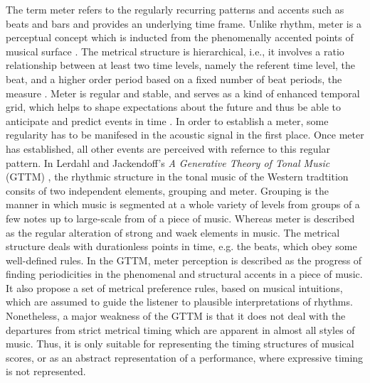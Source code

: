 \documentclass{scrartcl}
\begin{document}
The term meter refers to the regularly recurring patterns and accents such as beats and bars and provides an underlying time frame. Unlike rhythm, meter is a perceptual concept which is inducted from the phenomenally accented points of musical surface \cite{London2004}. The metrical structure is hierarchical, i.e., it involves a ratio relationship between at least two time levels, namely the referent time level, the beat, and a higher order period based on a fixed number of beat periods, the measure \cite{Yeston1976}. Meter is regular and stable, and serves as a kind of enhanced temporal grid, which helps to shape expectations about the future and thus be able to anticipate and predict events in time \cite{Huron2006}. In order to establish a meter, some regularity has to be manifesed in the acoustic signal in the first place. Once meter has established, all other events are perceived with refernce to this regular pattern.  In Lerdahl and Jackendoff's \emph{A Generative Theory of Tonal Music} (GTTM) \cite{Lerdahl1985}, the rhythmic structure in the tonal music of the Western tradtition consits of two independent elements, grouping and meter. Grouping is the manner in which music is segmented at a whole variety of levels from groups of a few notes up to large-scale from of a piece of music. Whereas meter is described as the regular alteration of strong and waek elements in music. The metrical structure deals with durationless points in time, e.g. the beats, which obey some well-defined rules. In the GTTM, meter perception is described as the progress of finding periodicities in the phenomenal and structural accents in a piece of music. It also propose a set of metrical preference rules, based on musical intuitions, which are assumed to guide the listener to plausible interpretations of rhythms. Nonetheless, a major weakness of the GTTM is that it does not deal with the departures from strict metrical timing which are apparent in almost all styles of music. Thus, it is only suitable for representing the timing structures of musical scores, or as an abstract representation of a performance, where expressive timing is not represented.



\end{document}
